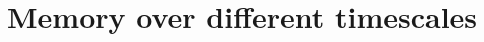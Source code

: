 \documentclass[final]{beamer}%
\newcommand{\eq}{\boldsymbol{\pi}}
\newcommand{\pot}{^{\text{pot}}}
\newcommand{\dep}{^{\text{dep}}}
\begin{document}
%
%
%
%
%
%
%
%
%


\section{Memory over different timescales}
\end{document}
